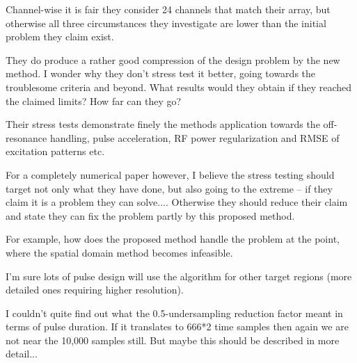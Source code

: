 \documentclass[11pt]{article}
\begin{document}
Channel-wise it is fair they consider 24 channels that match their array, but otherwise all three circumstances they investigate are lower than the initial problem they claim exist.

They do produce a rather good compression of the design problem by the new method. I wonder why they don't stress test it better, going towards the troublesome criteria and beyond. What results would they obtain if they reached the claimed limits? How far can they go?

Their stress tests demonstrate finely the methods application towards the off-resonance handling, pulse acceleration, RF power regularization and RMSE of excitation patterns etc.

For a completely numerical paper however, I believe the stress testing should target not only what they have done, but also going to the extreme -- if they claim it is a problem they can solve.... Otherwise they should reduce their claim and state they can fix the problem partly by this proposed method.

For example, how does the proposed method handle the problem at the point, where the spatial domain method becomes infeasible.

I'm sure lots of pulse design will use the algorithm for other target regions (more detailed ones requiring higher resolution).

I couldn't quite find out what the 0.5-undersampling reduction factor meant in terms of pulse duration. If it translates to 666*2 time samples then again we are not near the 10,000 samples still. But maybe this should be described in more detail...
\\[0.2em]
\indent{\it \textcolor{blue}{The pulse design problem we evaluated in this work
did lead to very long compute times for the spatial domain designs and very large matrix sizes for an explicit pseudoinverse design,
so we believe the problem does represent a challenging but practical design scenario with which to evaluate the new method. 
At the same time, we have revised the max number of time points we cite in the Introduction from 10,000 down to 2,500, 
since even for the finest RF sampling time we know of on a major vendor scanner (4 us on GE), a 2,500 time point pulse is fairly long at 10 ms. 
We have added description to clarify how the SPINS trajectory was undersampled,
which was by reducing (or increasing, in the reduction factor 0.5 case) the number of cycles in each of the three trajectory segments.
We also now list the pulse durations for each reduction factor. 
To increase the paper's rigor we also added measured design times for the spatial domain method and the new k-space method
across reduction factors.}}
\\[1.2em]
\end{document}
